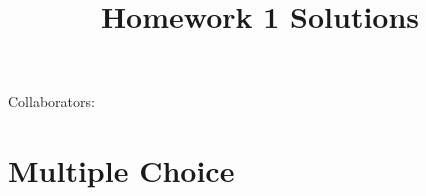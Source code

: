 \documentclass[12pt]{article}
\begin{document}
\title{Homework 1 Solutions}

Collaborators:

\section{Multiple Choice}
\end{document}
